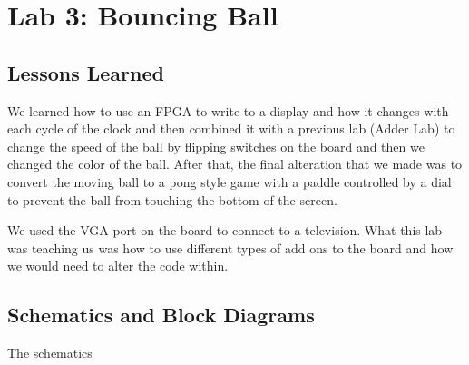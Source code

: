 \chapter{Lab 3: Bouncing Ball \\
\label{Introduction}}

\section{Lessons Learned \label{Section::Lessons Learned}}
    We learned how to use an FPGA to write to a display and how it changes with each cycle of the clock and then combined it with a previous lab (Adder Lab) to change the speed of the ball by flipping switches on the board and then we changed the color of the ball. After that, the final alteration that we made was to convert the moving ball to a pong style game with a paddle controlled by a dial to prevent the ball from touching the bottom of the screen. 

    We used the VGA port on the board to connect to a television. What this lab was teaching us was how to use different types of add ons to the board and how we would need to alter the code within. 
 \section{Schematics and Block Diagrams}
    The schematics
